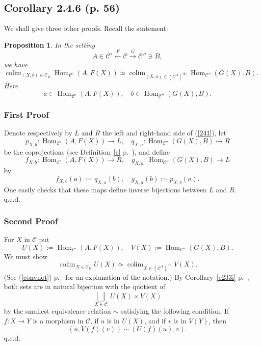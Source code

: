 \documentclass[12pt]{article}
\newtheorem{prop}[thm]{Proposition}
\theoremstyle{remark}
\theoremstyle{definition}
\newcommand{\C}{\mathcal C}
\newcommand{\cn}{(See (\ref{convnot}) p.~\pageref{convnot} for an explanation of the notation.) }%
\DeclareMathOperator*{\coli}{colim}
\DeclareMathOperator*{\co}{colim}
\DeclareMathOperator{\Hom}{Hom}%
\DeclareMathOperator{\op}{op}
\begin{document}
\subsection{Corollary 2.4.6 (p. 56)}
%
We shall give three other proofs. Recall the statement: 
%
\begin{prop} 
In the setting 
%
\begin{equation}\label{241s}
A\in\C'\xleftarrow{F}\C\xrightarrow{G}\C''\ni B, 
\end{equation} 
%
we have 
%
\begin{equation}\label{241} 
\coli_{(X,b)\in\C_B}\Hom_{\C'}(A,F(X))\simeq 
\coli_{(X,a)\in(\C^A)^{\op}}\Hom_{\C''}(G(X),B). 
\end{equation} 
%
Here 
$$
a\in\Hom_{\C'}(A,F(X)),\quad b\in\Hom_{\C''}(G(X),B). 
$$ 
\end{prop}
%
%
\subsubsection{First Proof}
%
Denote respectively by $L$ and $R$ the left and right-hand side of (\ref{241}), let 
$$
p_{X,b}:\Hom_{\C'}(A,F(X))\to L,\quad q_{X,a}:\Hom_{\C''}(G(X),B)\to R
$$
be the coprojections (see Definition~\ref{c} p.~\pageref{c}), and define 
$$
f_{X,b}:\Hom_{\C'}(A,F(X))\to R,\quad g_{X,a}:\Hom_{\C''}(G(X),B)\to L
$$
by
$$
f_{X,b}(a):=q_{X,a}(b),\quad g_{X,a}(b):=p_{X,b}(a).
$$
One easily checks that these maps define inverse bijections between $L$ and $R$. q.e.d. 
%
\subsubsection{Second Proof}
%
For $X$ in $\C$ put
%
\begin{equation}\label{p2}
U(X):=\Hom_{\C'}(A,F(X)),\quad V(X):=\Hom_{\C''}(G(X),B). 
\end{equation}
%
We must show 
$$
\co_{X\in\C_B}U(X)\simeq\co_{X\in(\C^A)^{\op}}V(X). 
$$ 
\cn By Corollary~\ref{c233i} p.~\pageref{c233i}, both sets are in natural bijection with the quotient of 
$$
\bigsqcup_{X\in\C}\ U(X)\times V(X) 
$$ 
by the smallest equivalence relation $\sim$ satisfying the following condition. If $f:X\to Y$ is a morphism in $\C$, if $u$ is in $U(X)$, and if $v$ is in $V(Y)$, then 
$$
(u,V(f)(v))\sim(U(f)(u),v). 
$$ 
q.e.d.
%
%
\end{document}
